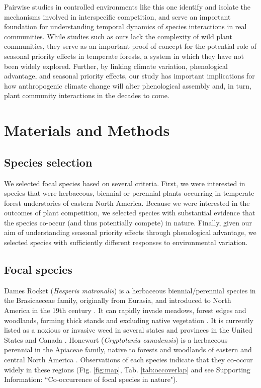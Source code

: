 \documentclass{article}[11pt]
\begin{document}
Pairwise studies in controlled environments like this one identify and isolate the mechanisms involved in interspecific competition, and serve an important foundation for understanding temporal dynamics of species interactions in real communities. While studies such as ours lack the complexity of wild plant communities, they serve as an important proof of concept for the potential role of seasonal priority effects in temperate forests, a system in which they have not been widely explored. Further, by linking climate variation, phenological advantage, and seasonal priority effects, our study has important implications for how anthropogenic climate change will alter phenological assembly and, in turn, plant community interactions in the decades to come.

\section*{Materials and Methods}

\subsection*{Species selection}
We selected focal species based on several criteria. First, we were interested in species that were herbaceous, biennial or perennial plants occurring in temperate forest understories of eastern North America. Because we were interested in the outcomes of plant competition, we selected species with substantial evidence that the species co-occur (and thus potentially compete) in nature. Finally, given our aim of understanding seasonal priority effects through phenological advantage, we selected species with sufficiently different responses to environmental variation.

\subsection*{Focal species}
Dames Rocket (\textit{Hesperis matronalis}) is a herbaceous biennial/perennial species in the Brasicaeceae family, originally from Eurasia, and introduced to North America in the 19th century \citep{Francis:2009wz}. It  can rapidly invade  meadows, forest edges and woodlands, forming thick stands and excluding native vegetation \citep{Francis:2009wz}. It is currently listed as a noxious or invasive weed in several states and provinces in the United States and Canada \citep{Susko:2008ut}. Honewort (\textit{Cryptotania canadensis}) is a herbaceous perennial in the Apiaceae family, native to forests and woodlands of eastern and central North America \citep{Hawkins:2007vb}. Observations of each species indicate that they co-occur widely in these regions (Fig. \ref{fig:map}, Tab. \ref{tab:occoverlap} and see Supporting Information: ``Co-occurrence of focal species in nature").  
\end{document}

